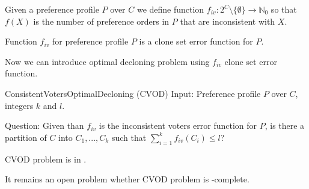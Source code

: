 \begin{defn}
Given a preference profile $P$ over $C$ we define function
$f_{iv}: 2^C \setminus \{\emptyset\} \rightarrow \mathbb{N}_0$ so that
$f(X)$ is the number of preference orders in $P$ that are inconsistent with $X$.
\end{defn}

\begin{rmrk}
Function $f_{iv}$ for preference profile $P$ is a clone set error function for $P$.
\end{rmrk}

Now we can introduce optimal decloning problem using $f_{iv}$ clone set error function.

\begin{problem}{ConsistentVotersOptimalDecloning (CVOD)}
	Input: Preference profile $P$ over $C$, integers $k$ and $l$.

	Question: Given than $f_{iv}$ is the inconsistent voters error function for $P$,
		is there a partition of $C$ into $C_1, ..., C_k$ such that $\sum_{i=1}^k f_{iv}(C_i) \leq l$?
\end{problem}

\begin{rmrk}
\textsc{CVOD} problem is in \np.
\end{rmrk}

It remains an open problem whether \textsc{CVOD} problem is \np-complete.
